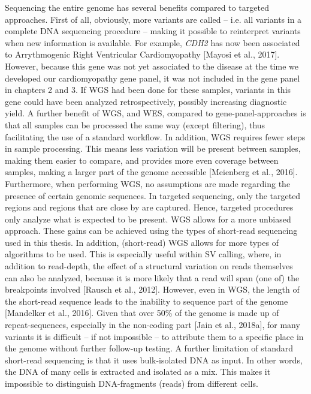 Sequencing the entire genome has several benefits compared to targeted approaches. 
First of all, obviously, more variants are called – i.e. all variants in a complete DNA sequencing procedure – making it possible to reinterpret variants when new information is available. 
For example, \textsl{CDH2} has now been associated to Arrythmogenic Right Ventricular Cardiomyopathy [Mayosi et al., 2017].
However, because this gene was not yet associated to the disease at the time we developed our cardiomyopathy gene panel, it was not included in the gene panel in chapters 2 and 3. 
If WGS had been done for these samples, variants in this gene could have been analyzed retrospectively, possibly increasing diagnostic yield. 
A further benefit of WGS, and WES, compared to gene-panel-approaches is that all samples can be processed the same way (except filtering), thus facilitating the use of a standard workflow. 
In addition, WGS requires fewer steps in sample processing. This means less variation will be present between samples, making them easier to compare, and provides more even coverage between samples, making a larger part of the genome accessible [Meienberg et al., 2016].
Furthermore, when performing WGS, no assumptions are made regarding the presence of certain genomic sequences. 
In targeted sequencing, only the targeted regions and regions that are close by are captured. 
Hence, targeted procedures only analyze what is expected to be present. WGS allows for a more unbiased approach. 
These gains can be achieved using the types of short-read sequencing used in this thesis. 
In addition, (short-read) WGS allows for more types of algorithms to be used. 
This is especially useful within SV calling, where, in addition to read-depth, the effect of a structural variation on reads themselves can also be analyzed, because it is more likely that a read will span (one of) the breakpoints involved [Rausch et al., 2012]. 
However, even in WGS, the length of the short-read sequence leads to the inability to sequence part of the genome [Mandelker et al., 2016].
Given that over 50\% of the genome is made up of repeat-sequences, especially in the non-coding part [Jain et al., 2018a], for many variants it is difficult – if not impossible – to attribute them to a specific place in the genome without further follow-up testing.
A further limitation of standard short-read sequencing is that it uses bulk-isolated DNA as input. 
In other words, the DNA of many cells is extracted and isolated as a mix. 
This makes it impossible to distinguish DNA-fragments (reads) from different cells. 
